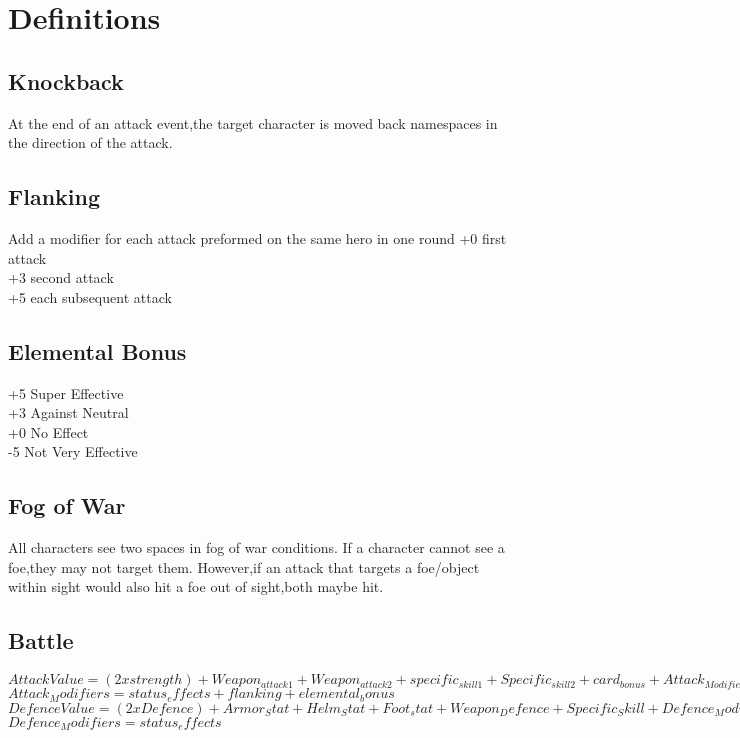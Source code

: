 \chapter{Definitions}

\section{Knockback}
At the end of an attack event,the target character is moved back namespaces in the direction of the attack.

\section{Flanking}
Add a modifier for each attack preformed on the same hero in one round
+0 first attack\\
+3 second attack\\
+5 each subsequent attack\\

\section{Elemental Bonus}
+5 Super Effective\\
+3 Against Neutral\\
+0 No Effect\\
-5 Not Very Effective

\section{Fog of War}
All characters see two spaces in fog of war conditions.  If a character cannot see a foe,they may not target them.  However,if an attack that targets a foe/object within sight would also hit a foe out of sight,both maybe hit.  

\section{Battle }
$Attack Value = (2 x strength)  + Weapon_{attack1} +Weapon_{attack2}+ specific_{skill1} + Specific_{skill2}  + card_{bonus}+ Attack_{Modifiers}$
$Attack_Modifiers = status_effects+ flanking + elemental_bonus$
$Defence Value = (2 x Defence)+ Armor_Stat+ Helm_Stat + Foot_stat+ Weapon_Defence+ Specific_Skill + Defence_Modifiers+5$
$Defence_Modifiers  =   status_effects$


